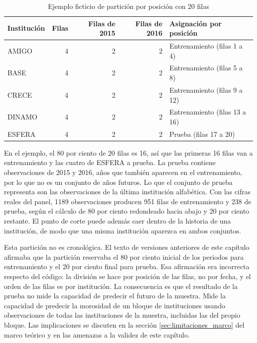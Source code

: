 \begin{table}[H]
\centering
\caption{Ejemplo ficticio de partición por posición con 20 filas}
\label{tab:met_particion_ejemplo}
\small
\begin{tabularx}{\textwidth}{Xrrrp{3.8cm}}
\toprule
\textbf{Institución} & \textbf{Filas} & \textbf{Filas de 2015} & \textbf{Filas de 2016} & \textbf{Asignación por posición} \\
\midrule
AMIGO & 4 & 2 & 2 & Entrenamiento (filas 1 a 4) \\
BASE & 4 & 2 & 2 & Entrenamiento (filas 5 a 8) \\
CRECE & 4 & 2 & 2 & Entrenamiento (filas 9 a 12) \\
DINAMO & 4 & 2 & 2 & Entrenamiento (filas 13 a 16) \\
ESFERA & 4 & 2 & 2 & Prueba (filas 17 a 20) \\
\bottomrule
\end{tabularx}
\end{table}

En el ejemplo, el 80 por ciento de 20 filas es 16, así que las primeras 16 filas van a entrenamiento y las cuatro de ESFERA a prueba. La prueba contiene observaciones de 2015 y 2016, años que también aparecen en el entrenamiento, por lo que no es un conjunto de años futuros. Lo que el conjunto de prueba representa son las observaciones de la última institución alfabética. Con las cifras reales del panel, 1189 observaciones producen 951 filas de entrenamiento y 238 de prueba, según el cálculo de 80 por ciento redondeado hacia abajo y 20 por ciento restante. El punto de corte puede además caer dentro de la historia de una institución, de modo que una misma institución aparezca en ambos conjuntos. %

Esta partición no es cronológica. El texto de versiones anteriores de este capítulo afirmaba que la partición reservaba el 80 por ciento inicial de los periodos para entrenamiento y el 20 por ciento final para prueba. Esa afirmación era incorrecta respecto del código: la división se hace por posición de las filas, no por fecha, y el orden de las filas es por institución. La consecuencia es que el resultado de la prueba no mide la capacidad de predecir el futuro de la muestra. Mide la capacidad de predecir la morosidad de un bloque de instituciones usando observaciones de todas las instituciones de la muestra, incluidas las del propio bloque. Las implicaciones se discuten en la sección \ref{sec:limitaciones_marco} del marco teórico y en las amenazas a la validez de este capítulo.

